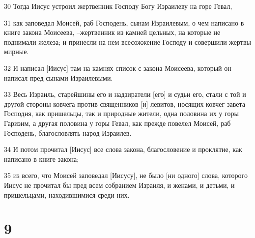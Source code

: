 \par 30 Тогда Иисус устроил жертвенник Господу Богу Израилеву на горе Гевал,
\par 31 как заповедал Моисей, раб Господень, сынам Израилевым, о чем написано в книге закона Моисеева, --жертвенник из камней цельных, на которые не поднимали железа; и принесли на нем всесожжение Господу и совершили жертвы мирные.
\par 32 И написал [Иисус] там на камнях список с закона Моисеева, который он написал пред сынами Израилевыми.
\par 33 Весь Израиль, старейшины его и надзиратели [его] и судьи его, стали с той и другой стороны ковчега против священников [и] левитов, носящих ковчег завета Господня, как пришельцы, так и природные жители, одна половина их у горы Гаризим, а другая половина у горы Гевал, как прежде повелел Моисей, раб Господень, благословлять народ Израилев.
\par 34 И потом прочитал [Иисус] все слова закона, благословение и проклятие, как написано в книге закона;
\par 35 из всего, что Моисей заповедал [Иисусу], не было [ни одного] слова, которого Иисус не прочитал бы пред всем собранием Израиля, и женами, и детьми, и пришельцами, находившимися среди них.

\chapter{9}

